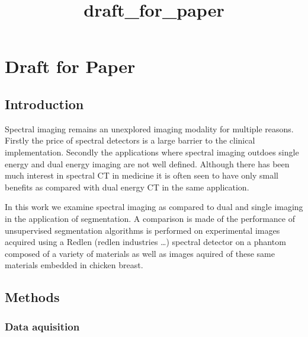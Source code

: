 \documentclass[11pt]{article}
\title{draft\_for\_paper}
\begin{document}
    
    
    \maketitle
    
    

    










    \hypertarget{draft-for-paper}{%
\section{Draft for Paper}\label{draft-for-paper}}

    \hypertarget{introduction}{%
\subsection{Introduction}\label{introduction}}



    Spectral imaging remains an unexplored imaging modality for multiple
reasons. Firstly the price of spectral detectors is a large barrier to
the clinical implementation. Secondly the applications where spectral
imaging outdoes single energy and dual energy imaging are not well
defined. Although there has been much interest in spectral CT in
medicine it is often seen to have only small benefits as compared with
dual energy CT in the same application.

In this work we examine spectral imaging as compared to dual and single
imaging in the application of segmentation. A comparison is made of the
performance of unsupervised segmentation algorithms is performed on
experimental images acquired using a Redlen (redlen industries \ldots{})
spectral detector on a phantom composed of a variety of materials as
well as images aquired of these same materials embedded in chicken
breast.

    \hypertarget{methods}{%
\subsection{Methods}\label{methods}}

    \hypertarget{data-aquisition}{%
\subsubsection{Data aquisition}\label{data-aquisition}}
\end{document}
